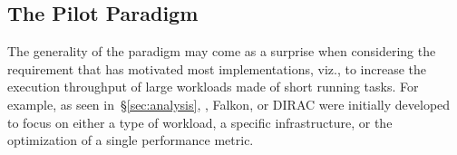 \documentclass{sig-alternate}
\begin{document}

\subsection{The Pilot Paradigm}
\label{sec:paradigm}



The generality of the \pilot paradigm may come as a surprise when considering
the requirement that has motivated most implementations, viz., to increase the
execution throughput of large workloads made of short running tasks. For
example, as seen in~\S\ref{sec:analysis}, \panda, Falkon, or DIRAC were
initially developed to focus on either a type of workload, a specific
infrastructure, or the optimization of a single performance metric.





\end{document}
